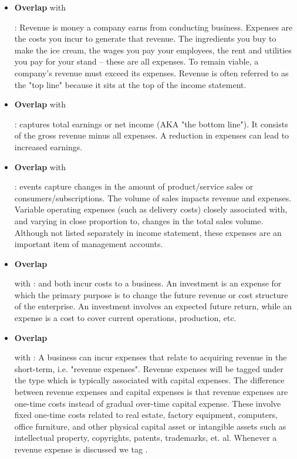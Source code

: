 \begin{itemize}[noitemsep,leftmargin=*]
    \item \hypertarget{expensevsrevenue}{\textbf{Overlap} with }: Revenue is money a company earns from conducting business. Expenses are the costs you incur to generate that revenue. The ingredients you buy to make the ice cream, the wages you pay your employees, the rent and utilities you pay for your stand -- these are all expenses. To remain viable, a company's revenue must exceed its expenses. Revenue is often referred to as the "top line" because it sits at the top of the income statement.
    \item \hypertarget{expensevsprofitloss}{\textbf{Overlap} with }:  captures total earnings or net income (AKA "the bottom line"). It consists of the gross revenue minus all expenses. A reduction in expenses can lead to increased earnings.
    \item \hypertarget{expensevssalesvolume}{\textbf{Overlap} with }:  events capture changes in the amount of product/service sales or consumers/subscriptions. The volume of sales impacts revenue and expenses. Variable operating expenses (such as delivery costs) closely associated with, and varying in close proportion to, changes in the total sales volume. Although not listed separately in income statement, these expenses are an important item of management accounts.
    \item \hypertarget{expensevsinvestment}{\textbf{Overlap}} with :  and  both incur costs to a business. An investment is an expense for which the primary purpose is to change the future revenue or cost structure of the enterprise. An investment involves an expected future return, while an expense is a cost to cover current operations, production, etc. 
    \item \hypertarget{expensevsrevenue}{\textbf{Overlap}} with :	A business can incur expenses that relate to acquiring revenue in the short-term, i.e. "revenue expenses". Revenue expenses will be tagged under the  type which is typically associated with capital expenses. The difference between revenue expenses and capital expenses is that revenue expenses are one-time costs instead of gradual over-time capital expense. These involve fixed one-time costs related to real estate, factory equipment, computers, office furniture, and other physical capital asset or intangible assets such as intellectual property, copyrights, patents, trademarks, et. al. Whenever a revenue expense is discussed we tag .

\end{itemize}
